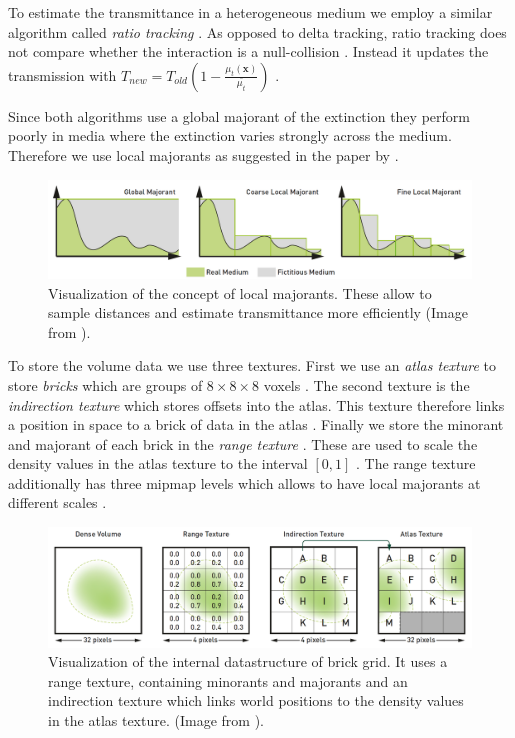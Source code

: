To estimate the transmittance in a heterogeneous medium we employ a similar algorithm called \textit{ratio tracking} \cite{novak_ratio_tracking}.
As opposed to delta tracking, ratio tracking does not compare whether the interaction is a null-collision \cite{novak_ratio_tracking}.
Instead it updates the transmission with $T_{new} = T_{old}(1 - \frac{\mu_t(\boldsymbol{x})}{\bar{\mu_t}})$ \cite{novak_ratio_tracking}.

Since both algorithms use a global majorant of the extinction they perform poorly in media where the extinction varies strongly across the medium.
Therefore we use local majorants as suggested in the paper  by \citeauthor{brick_grid} \cite{brick_grid}.
\begin{figure}[ht]
    \centering
    \includegraphics[width=0.9\linewidth]{img/brick_grid_majorants.png}
    \caption{Visualization of the concept of local majorants. These allow to sample distances and estimate transmittance more efficiently (Image from \cite{brick_grid}).}
    \label{fig:brick_grid_datastructure}
\end{figure}
To store the volume data we use three textures.
First we use an \textit{atlas texture} to store \textit{bricks} which are groups of $8 \times 8 \times 8$ voxels \cite{brick_grid}.
The second texture is the \textit{indirection texture} which stores offsets into the atlas.
This texture therefore links a position in space to a brick of data in the atlas \cite{brick_grid}.
Finally we store the minorant and majorant of each brick in the \textit{range texture} \cite{brick_grid}.
These are used to scale the density values in the atlas texture to the interval $[0, 1]$ \cite{brick_grid}.
The range texture additionally has three mipmap levels which allows to have local majorants at different scales \cite{brick_grid}.
\begin{figure}[ht]
    \centering
    \includegraphics[width=0.9\linewidth]{img/brick_grid_datastructure.png}
    \caption{Visualization of the internal datastructure of brick grid. It uses a range texture, containing minorants and majorants and an indirection texture which links world positions to the density values in the atlas texture. (Image from \cite{brick_grid}).}
    \label{fig:brick_grid_datastructure}
\end{figure}
